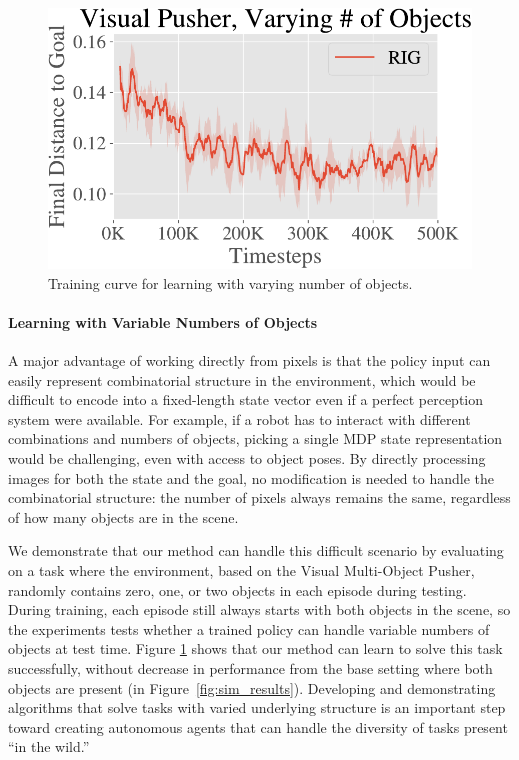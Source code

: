 \begin{figure}
    \centering
    \vspace{-0.2in}
    \includegraphics[width=\linewidth]{rig/img/pusher_vary_multiobject.pdf}
    \vspace{-0.1in}
    \caption{Training curve for learning with varying number of objects.}
    \vspace{-0.2in}
    \label{fig:multiobject}
\end{figure}

\vspace{-0.1in}
\paragraph{Learning with Variable Numbers of Objects}
A major advantage of working directly from pixels is that the policy input can easily represent combinatorial structure in the environment, which would be difficult to encode into a fixed-length state vector even if a perfect perception system were available.
For example, if a robot has to interact with different combinations and numbers of objects, picking a single MDP state representation would be challenging, even with access to object poses.
By directly processing images for both the state and the goal, no modification is needed to handle the combinatorial structure: the number of pixels always remains the same, regardless of how many objects are in the scene.

We demonstrate that our method can handle this difficult scenario by evaluating on a task where the environment, based on the Visual Multi-Object Pusher, randomly contains zero, one, or two objects in each episode during testing.
During training, each episode still always starts with both objects in the scene, so the experiments tests whether a trained policy can handle variable numbers of objects at test time.
Figure \ref{fig:multiobject} shows that our method can learn to solve this task successfully, without decrease in performance from the base setting where both objects are present (in Figure~\ref{fig:sim_results}).
Developing and demonstrating algorithms that solve tasks with varied underlying structure is an important step toward creating autonomous agents that can handle the diversity of tasks present ``in the wild.''

